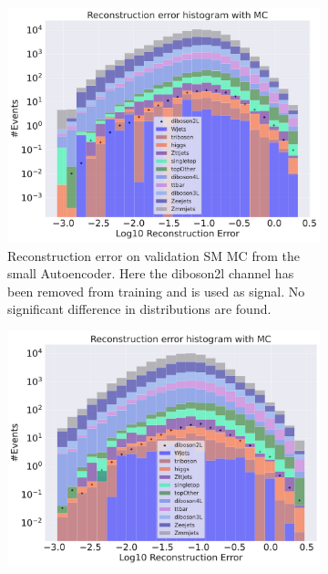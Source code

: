 \begin{figure}[H]
    \centering
    \begin{subfigure}{.45\textwidth}
        \includegraphics[width=\textwidth]{Figures/VAE_testing/small/b_data_recon_big_rm3_feats_sig_diboson2l.pdf}
        \caption{Reconstruction error on validation SM MC from the small Autoencoder. Here the diboson2l channel has been removed from training and 
        is used as signal. No significant difference in distributions are found.}
        \label{fig:vae_small_diboson2l}
    \end{subfigure}
    \hfill 
    \begin{subfigure}{.45\textwidth}
        \includegraphics[width=\textwidth]{Figures/VAE_testing/big/b_data_recon_big_rm3_feats_sig_diboson2l.pdf}

\end{subfigure}
\end{figure}

